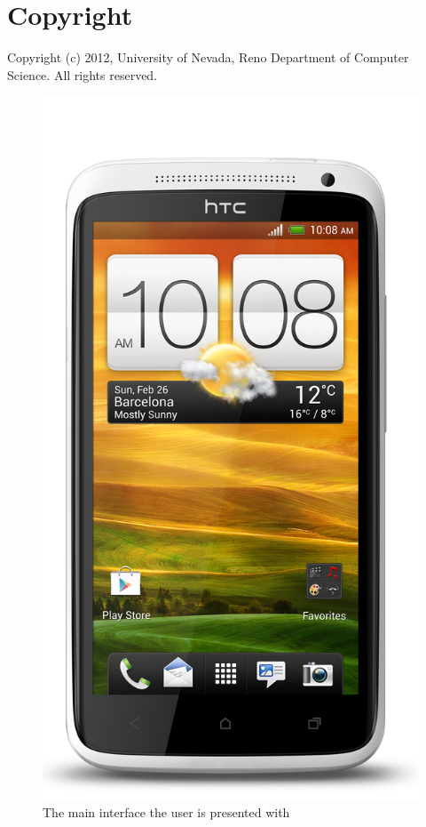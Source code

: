 \documentclass{chi-ext}
\begin{document}
\section{Copyright}

Copyright (c) 2012, University of Nevada, Reno Department of Computer Science.
All rights reserved.

\pagebreak

\begin{figure} %
\parbox{1\columnwidth}{

\centering \includegraphics[width=0.8\columnwidth]{onex.jpg} \caption{The main
interface the user is presented with} \label{fig:maininterface} } \end{figure}
\end{document}
